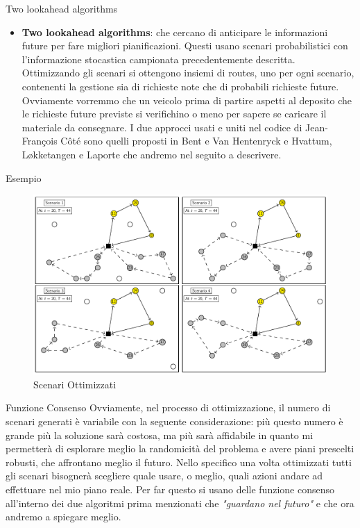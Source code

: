 \documentclass[10pt]{beamer}
\begin{document}
    \begin{frame}{Two lookahead algorithms}
        \begin{itemize}
             \item \textbf{Two lookahead algorithms}: che cercano di anticipare le informazioni future per fare migliori pianificazioni. Questi usano scenari probabilistici con l'informazione stocastica campionata precedentemente descritta. Ottimizzando gli scenari si ottengono insiemi di routes, uno per ogni scenario, contenenti la gestione sia di richieste note che di probabili richieste future. Ovviamente vorremmo che un veicolo prima di partire aspetti al deposito che le richieste future previste si verifichino o meno per sapere se caricare il materiale da consegnare. I due approcci usati e uniti nel codice di Jean-François Côté sono quelli proposti in Bent e Van Hentenryck\cite{SBPPDVR} e Hvattum, Løkketangen e Laporte \cite{BRH} che andremo nel seguito a descrivere.
        \end{itemize}
    \end{frame}

  \begin{frame}{Esempio}
        \begin{figure}[h!]
            \centering
            \includegraphics[scale=0.3]{Images/OptimizedScenario.png}
            \caption{Scenari Ottimizzati}
            \label{fig:optimizedScenario}
        \end{figure}
  \end{frame}

  \begin{frame}{Funzione Consenso}
      Ovviamente, nel processo di ottimizzazione, il numero di scenari generati è variabile con la seguente considerazione: più questo numero è grande più la soluzione sarà costosa, ma più sarà affidabile in quanto mi permetterà di esplorare meglio la randomicità del problema e avere piani prescelti robusti, che affrontano meglio il futuro. Nello specifico una volta ottimizzati tutti gli scenari  bisognerà scegliere quale usare, o meglio, quali azioni andare ad effettuare nel mio piano reale. Per far questo si usano delle funzione consenso all'interno dei due algoritmi prima menzionati che \textit{"guardano nel futuro"} e che ora andremo a spiegare meglio.
  \end{frame}
\end{document}
